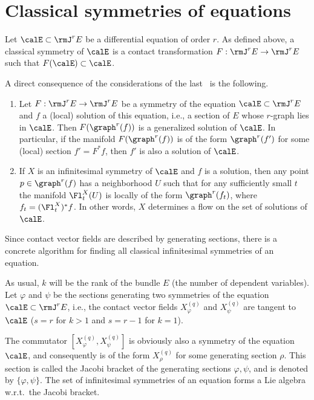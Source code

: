 \section{Classical symmetries of equations}

Let $\calE\subset \rmJ^rE$ be a differential equation of order $r$. As defined above, a classical symmetry of $\calE$ is a contact transformation $F:\rmJ^rE\to \rmJ^rE$ such that $F(\calE)\subset\calE$.

A direct consequence of the considerations of the last \sect\ is the following.

\begin{prop}
    \begin{enumerate}
        \item Let $F:\rmJ^rE\to \rmJ^rE$ be a symmetry of the equation $\calE\subset\rmJ^rE$ and $f$ a (local) solution of this equation, i.e., a section of $E$ whose $r$-graph lies in $\calE$. Then $F(\graph^r(f))$ is a generalized solution of $\calE$. In particular, if the manifold $F(\graph^r(f))$ is of the form $\graph^r(f')$ for some (local) section $f'=F^\ast f$, then $f'$ is also a solution of $\calE$.
        \item If $X$ is an infinitesimal symmetry of $\calE$ and $f$ is a solution, then any point $p\in \graph^r(f)$ has a neighborhood $U$ such that for any sufficiently small $t$ the manifold $\Fl^X_t(U)$ is locally of the form $\graph^r(f_t)$, where $f_t=(\Fl^X_t)^\ast f$. In other words, $X$ determines a flow on the set of solutions of $\calE$.
    \end{enumerate}
\end{prop}

Since contact vector fields are described by generating sections, there is a concrete algorithm for finding all classical infinitesimal symmetries of an equation. 

As usual, $k$ will be the rank of the bundle $E$ (the number of dependent variables). Let $\varphi$ and $\psi$ be the sections generating two symmetries of the equation $\calE\subset\rmJ^rE$, i.e., the contact vector fields $X_\varphi^{(q)}$ and $X_\psi^{(q)}$ are tangent to $\calE$ ($s=r$ for $k>1$ and $s=r-1$ for $k=1$). 

\begin{defn}
    The commutator $[X_\varphi^{(q)},X_\psi^{(q)}]$ is obviously also a symmetry of the equation $\calE$, and consequently is of the form $X_\rho^{(q)}$ for some generating section $\rho$. This section is called the Jacobi bracket of the generating sections $\varphi,\psi$, and is denoted by $\{\varphi,\psi\}$. The set of infinitesimal symmetries of an equation forms a Lie algebra w.r.t.\ the Jacobi bracket.
\end{defn}


